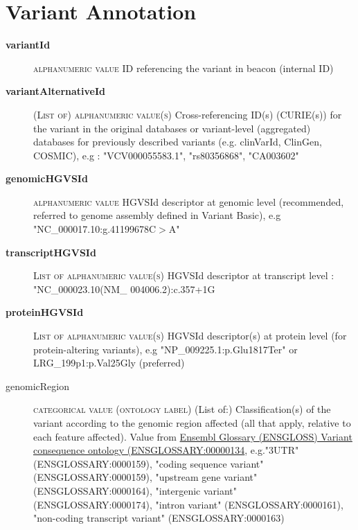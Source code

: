 \documentclass[a4paper, 10pt]{article}        %
\begin{document}
 
  \section*{ {\color{teal} Variant Annotation}}
  
  \begin{description}
	\item[\textbf{variantId}] {\textsc{alphanumeric value}} ID referencing the variant in beacon (internal ID)
	\item[\textbf{variantAlternativeId}] {\textsc{(List of) alphanumeric value(s)}} Cross-referencing ID(s) (CURIE(s)) for the variant in the original databases or variant-level (aggregated) databases for previously described variants (e.g. clinVarId, ClinGen, COSMIC), e.g : "VCV000055583.1", "rs80356868", "CA003602"
	\item[\textbf{genomicHGVSId}]  {\textsc{alphanumeric value}} HGVSId descriptor at genomic level (recommended, referred to genome assembly defined in Variant Basic), e.g "NC\_000017.10:g.41199678C$>$A"
	\item[\textbf{transcriptHGVSId}] {\textsc{List of alphanumeric value(s)}} HGVSId descriptor at transcript level : "NC\_000023.10(NM\_ 004006.2):c.357+1G%
	\item[\textbf{proteinHGVSId}] {\textsc{List of alphanumeric value(s)}} HGVSId descriptor(s) at protein level (for protein-altering variants), e.g "NP\_009225.1:p.Glu1817Ter" or LRG\_199p1:p.Val25Gly (preferred)
	\item[genomicRegion] {\textsc{categorical value (ontology label)}} (List of:) Classification(s) of the variant according to the genomic region affected (all that apply, relative to each feature affected). Value from \href{http://ensembl.org/glossary/ENSGLOSSARY_0000134}{Ensembl Glossary (ENSGLOSS) Variant consequence ontology (ENSGLOSSARY:00000134}, e.g."3UTR" (ENSGLOSSARY:0000159), "coding sequence variant" (ENSGLOSSARY:0000159), "upstream gene variant" (ENSGLOSSARY:0000164), "intergenic variant" (ENSGLOSSARY:0000174), "intron variant" (ENSGLOSSARY:0000161), "non-coding transcript variant" (ENSGLOSSARY:0000163)


\end{description}
\end{document}
